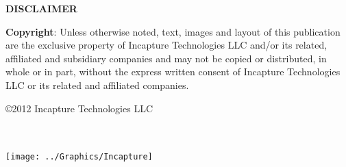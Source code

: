 \documentclass[ 11pt, a4paper, footinclude=true, headinclude=true]{scrbook}
\begin{document}
\tableofcontents
\listoftables
\listoffigures


\clearpage
{}  
\thispagestyle{MyInCapturePageStyle}

\vspace*{10pt}

\color{incapturecolor} 

\begin{center} \textbf{DISCLAIMER} \end{center}

\textbf{Copyright}: Unless otherwise noted, text, images and layout of this publication are the exclusive property of Incapture Technologies LLC and/or its related, affiliated and subsidiary companies and may not be copied or distributed, in whole or in part, without the express written consent of Incapture Technologies LLC or its related and affiliated companies.

\begin{center} \copyright 2012 Incapture Technologies LLC \end{center}
    
\clearpage

\thispagestyle{empty}  %
\begin{center}   
\large 
\hfill
\vfill 
\color{Maroon}\small\spacedallcaps{\myCompanyFull} \\ 
\color{Black}\small{\myCompanyAddress} \\
\vspace{100pt}
\texttt{[image: ../Graphics/Incapture]} 
\end{center}
 
\end{document}
